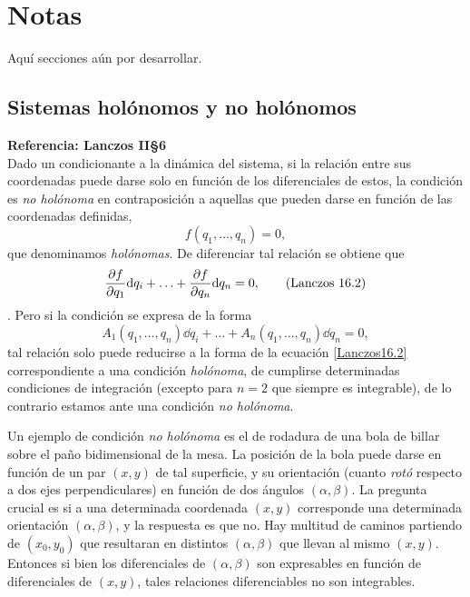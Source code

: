\documentclass[12pt, spanish, a4paper, ]{article}
\begin{document}
\appendix

\section{Notas}
Aquí secciones aún por desarrollar.



\subsection{Sistemas holónomos y no holónomos} 
\textbf{Referencia: Lanczos II\S6}\\

Dado un condicionante a la dinámica del sistema, si la relación entre sus coordenadas puede darse solo en función de los diferenciales de estos, la condición es \emph{no holónoma} en contraposición a aquellas que pueden darse en función de las coordenadas definidas, 
\begin{equation}\label{Lanczos16.1}
	f(q_1,\ldots,q_n) =0,
	\tag{Lanczos 16.1}
\end{equation}
que denominamos \emph{holónomas}.
De diferenciar tal relación se obtiene que
\begin{equation}\label{Lanczos16.2}
	\pdv{f}{q_1} \dd q_i + \ldots+ \pdv{f}{q_n} \dd q_n = 0,
	\tag{Lanczos 16.2}
\end{equation}.
Pero si la condición se expresa de la forma
\begin{equation}\label{Lanczos16.3}
	A_1(q_1,\ldots,q_n) \dd q_i+\ldots+ A_n(q_1,\ldots,q_n) \dd q_n =0,
	\tag{Lanczos 16.3}
\end{equation} 
tal relación solo puede reducirse a la forma de la ecuación \eqref{Lanczos16.2} correspondiente a una condición \emph{holónoma}, de cumplirse determinadas condiciones de integración (excepto para \(n=2\) que siempre es integrable), de lo contrario estamos ante una condición \emph{no holónoma}. 

Un ejemplo de condición \emph{no holónoma} es el de rodadura de una bola de billar sobre el paño bidimensional de la mesa.
La posición de la bola puede darse en función de un par \((x,y)\) de tal superficie, y su orientación (cuanto \emph{rotó} respecto a dos ejes perpendiculares) en función de dos ángulos \((\alpha, \beta)\).
La pregunta crucial es si a una determinada coordenada \((x,y)\) corresponde una determinada orientación \((\alpha, \beta)\), y la respuesta es que no.
Hay multitud de caminos partiendo de \((x_0,y_0)\) que resultaran en distintos \((\alpha, \beta)\) que llevan al mismo \((x,y)\).
Entonces si bien los diferenciales de \((\alpha, \beta)\) son expresables en función de diferenciales de \((x,y)\), tales relaciones diferenciables no son integrables.
\end{document}

